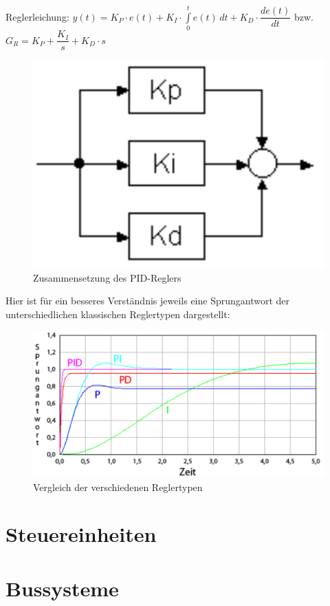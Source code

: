 Reglerleichung: \hspace{3mm} $y(t) = K_P \cdot e(t) + K_I \cdot \int\limits_{0}^{t} e(t) \,dt + K_D \cdot \dfrac{de(t)}{dt}$ \hspace{3mm} bzw. \hspace{3mm} $G_R = K_P + \dfrac{K_I}{s} + K_D \cdot s$

\begin{figure}[H]
	\begin{center}
		\includegraphics[scale=0.15]{figures/antrieb/PID_Regler.png}
		\caption{Zusammensetzung des PID-Reglers}
	\end{center}
\end{figure}

Hier ist für ein besseres Verständnis jeweils eine Sprungantwort der unterschiedlichen klassischen Reglertypen dargestellt:
 
\begin{figure}[H]
	\begin{center}
		\includegraphics[scale=0.3]{figures/antrieb/Reglertypen.png}
		\caption{Vergleich der verschiedenen Reglertypen}
	\end{center}
\end{figure}
\newpage


\section{Steuereinheiten}
\section{Bussysteme}
